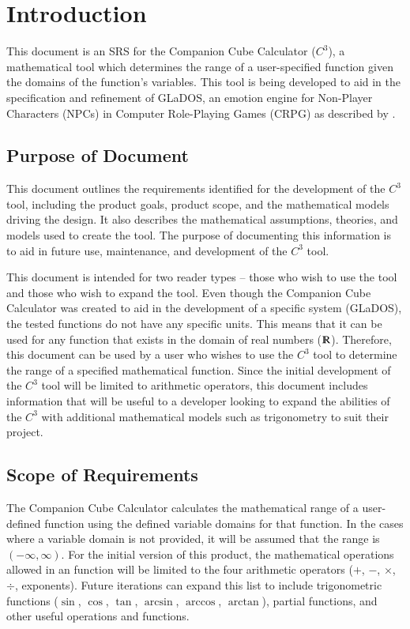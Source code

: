 \documentclass[12pt]{article}
\newcommand{\progname}{Companion Cube Calculator} %
\newcommand{\prognameAbbrv}{$C^{3}$}
\begin{document}
\newpage
{}

\section{Introduction}
\label{intro}
This document is an SRS for the \progname{} (\prognameAbbrv{}), a mathematical 
tool which determines the range of a user-specified function given the domains 
of the function's variables. This tool is being developed to aid in the 
specification and refinement of GLaDOS, an emotion engine for Non-Player 
Characters (NPCs) in Computer Role-Playing Games (CRPG) as described by 
\citet{glados}.

\subsection{Purpose of Document}
This document outlines the requirements identified for the development of the 
\prognameAbbrv{} tool, including the product goals, product scope, and the 
mathematical models driving the design. It also describes the mathematical 
assumptions, theories, and models used to create the tool. The purpose of 
documenting this information is to aid in future use, maintenance, and 
development of the \prognameAbbrv{} tool.

This document is intended for two reader types -- those who wish to use the 
tool and those who wish to expand the tool. Even though the \progname{} was 
created to aid in the development of a specific system (GLaDOS), the tested 
functions do not have any specific units. This means that it can be used for 
any function that exists in the domain of real numbers ($\varmathbb{R}$). 
Therefore, this document can be used by a user who wishes to use the 
\prognameAbbrv{} tool to determine the range of a specified mathematical 
function. Since the initial development of the \prognameAbbrv{} tool will be 
limited to arithmetic operators, this document includes information that will 
be useful to a developer looking to expand the abilities of the 
\prognameAbbrv{} with additional mathematical models such as trigonometry to 
suit their project.

\subsection{Scope of Requirements} 
The \progname{} calculates the mathematical range of a user-defined function 
using the defined variable domains for that function. In the cases where a 
variable domain is not provided, it will be assumed that the range is 
$(-\infty, \infty)$. For the initial version of this product, the mathematical 
operations allowed in an function will be limited to the four arithmetic 
operators ($+$, $-$, $\times$, $\div$, exponents). Future iterations can expand 
this list to include trigonometric functions ($\sin$, $\cos$, $\tan$, $\arcsin$,
$\arccos$, $\arctan$), partial functions, and other useful operations and 
functions.
\end{document}
